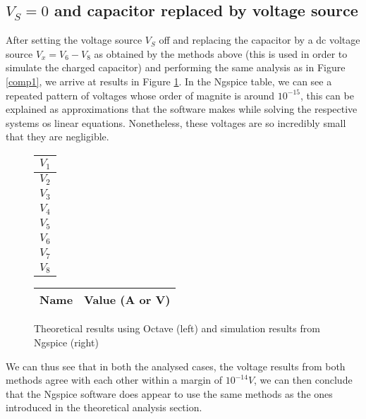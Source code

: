 \subsection{$V_S = 0$ and capacitor replaced by voltage source}
\hspace{12pt} After setting the voltage source $V_S$ off and replacing the capacitor by a dc voltage source $V_x = V_6 - V_8$ as obtained by the methods above (this is used in order to simulate the charged capacitor) and performing the same analysis as in Figure \ref{comp1}, we arrive at results in Figure \ref{comp2}. In the Ngspice table, we can see a repeated pattern of voltages whose order of magnite is around $10^{-15}$, this can be explained as approximations that the software makes while solving the respective systems os linear equations. Nonetheless, these voltages are so incredibly small that they are negligible. 

\begin{figure}[h]
	\begin{minipage}{.3\textwidth}
		\flushright
		\begin{tabular}{|c|}
		    \hline
		    $V_1$ \\
		    \hline
		    $V_2$ \\
		    \hline
		    $V_3$ \\
		    \hline
		    $V_4$ \\
		    \hline
		    $V_5$ \\
		    \hline
		    $V_6$ \\
		    \hline
		    $V_7$ \\
		    \hline
		    $V_8$ \\
		    \hline
		\end{tabular}
	\end{minipage}	
	\hspace{-8pt}
	\begin{minipage}{.3\textwidth}
		\flushleft
		
	\end{minipage}
	\hspace{10pt}
	\begin{minipage}{.3\textwidth}
		\begin{tabular}{|c|c|}
			\hline
			\textbf{Name} & \textbf{Value (A or V)} \\
			\hline
			
		\end{tabular}
	\end{minipage}
	\caption{Theoretical results using Octave (left) and simulation results from Ngspice (right)}    
	\label{comp2}
\end{figure}

We can thus see that in both the analysed cases, the voltage results from both methods agree with each other within a margin of $10^{-14} V$, we can then conclude that the Ngspice software does appear to use the same methods as the ones introduced in the theoretical analysis section.
